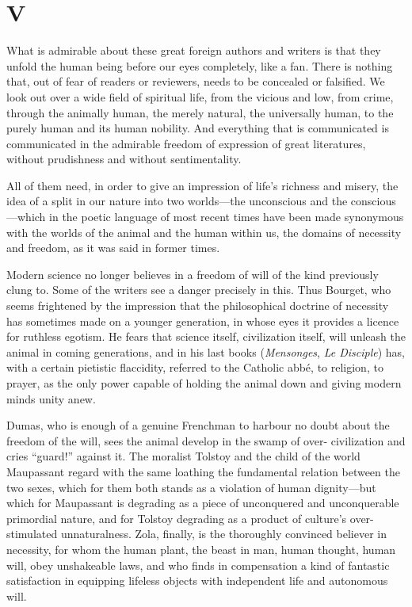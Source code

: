 \documentclass[12pt,a4paper]{article}
\begin{document}
\section*{V}

What is admirable about these great foreign authors and writers is
that they unfold the human being before our eyes completely, like a
fan. There is nothing that, out of fear of readers or reviewers, needs
to be concealed or falsified. We look out over a wide field of
spiritual life, from the vicious and low, from crime, through the
animally human, the merely natural, the universally human, to the
purely human and its human nobility. And everything that is communicated
is communicated in the admirable freedom of expression of great
literatures, without prudishness and without sentimentality.

All of them need, in order to give an impression of life's richness
and misery, the idea of a split in our nature into two worlds---the
unconscious and the conscious---which in the poetic language of most
recent times have been made synonymous with the worlds of the animal
and the human within us, the domains of necessity and freedom, as it
was said in former times.

Modern science no longer believes in a freedom of will of the kind
previously clung to. Some of the writers see a danger precisely in
this. Thus Bourget, who seems frightened by the impression that the
philosophical doctrine of necessity has sometimes made on a younger
generation, in whose eyes it provides a licence for ruthless egotism.
He fears that science itself, civilization itself, will unleash the
animal in coming generations, and in his last books (\textit{Mensonges},
\textit{Le Disciple}) has, with a certain pietistic flaccidity,
referred to the Catholic abbé, to religion, to prayer, as the only
power capable of holding the animal down and giving modern minds unity
anew.

Dumas, who is enough of a genuine Frenchman to harbour no doubt about
the freedom of the will, sees the animal develop in the swamp of over-
civilization and cries ``guard!'' against it. The moralist Tolstoy and
the child of the world Maupassant regard with the same loathing the
fundamental relation between the two sexes, which for them both stands
as a violation of human dignity---but which for Maupassant is
degrading as a piece of unconquered and unconquerable primordial nature,
and for Tolstoy degrading as a product of culture's over-stimulated
unnaturalness. Zola, finally, is the thoroughly convinced believer in
necessity, for whom the human plant, the beast in man, human thought,
human will, obey unshakeable laws, and who finds in compensation a
kind of fantastic satisfaction in equipping lifeless objects with
independent life and autonomous will.
\end{document}
